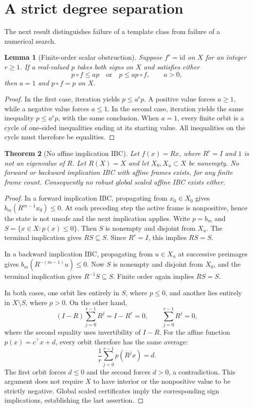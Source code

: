 \documentclass[5p,times]{elsarticle}
\newtheorem{theorem}{Theorem}
\newtheorem{lemma}[theorem]{Lemma}
\theoremstyle{definition}\newtheorem{definition}[theorem]{Definition}
\theoremstyle{remark}\newtheorem{remark}[theorem]{Remark}
\begin{document}
\section{A strict degree separation}\label{sec:separation}
The next result distinguishes failure of a template class from failure of a numerical search.
\begin{lemma}[Finite-order scalar obstruction]\label{lem:finite}
Suppose $f^r=\mathrm{id}$ on $X$ for an integer $r\ge1$. If a real-valued $p$ takes both signs on $X$ and satisfies either
\[
 p\circ f\le a p\quad\text{or}\quad p\le a p\circ f,
 \qquad a>0,
\]
then $a=1$ and $p\circ f=p$ on $X$.
\end{lemma}
\begin{proof}
In the first case, iteration yields $p\le a^r p$. A positive value forces $a\ge1$, while a negative value forces $a\le1$. In the second case, iteration yields the same inequality $p\le a^r p$, with the same conclusion. When $a=1$, every finite orbit is a cycle of one-sided inequalities ending at its starting value. All inequalities on the cycle must therefore be equalities.
\end{proof}

\begin{theorem}[No affine implication IBC]\label{thm:obstruction}
Let $f(x)=Rx$, where $R^r=I$ and $1$ is not an eigenvalue of $R$. Let $R(X)=X$ and let $X_0,X_u\subset X$ be nonempty. No forward or backward implication IBC with affine frames exists, for any finite frame count. Consequently no robust global scaled affine IBC exists either.
\end{theorem}
\begin{proof}
In a forward implication IBC, propagating from $x_0\in X_0$ gives $b_m(R^{m-1}x_0)\le0$. At each preceding step the active frame is nonpositive, hence the state is not unsafe and the next implication applies. Write $p=b_m$ and $S=\{x\in X:p(x)\le0\}$. Then $S$ is nonempty and disjoint from $X_u$. The terminal implication gives $RS\subseteq S$. Since $R^r=I$, this implies $RS=S$.

In a backward implication IBC, propagating from $u\in X_u$ at successive preimages gives $b_m(R^{-(m-1)}u)\le0$. Now $S$ is nonempty and disjoint from $X_0$, and the terminal implication gives $R^{-1}S\subseteq S$. Finite order again implies $RS=S$.

In both cases, one orbit lies entirely in $S$, where $p\le0$, and another lies entirely in $X\setminus S$, where $p>0$. On the other hand,
\[
 (I-R)\sum_{j=0}^{r-1}R^j=I-R^r=0,
 \qquad \sum_{j=0}^{r-1}R^j=0,
\]
where the second equality uses invertibility of $I-R$. For the affine function $p(x)=c^\top x+d$, every orbit therefore has the same average:
\[
 \frac1r\sum_{j=0}^{r-1}p(R^jx)=d.
\]
The first orbit forces $d\le0$ and the second forces $d>0$, a contradiction. This argument does not require $X$ to have interior or the nonpositive value to be strictly negative. Global scaled certificates imply the corresponding sign implications, establishing the last assertion.
\end{proof}
\end{document}
